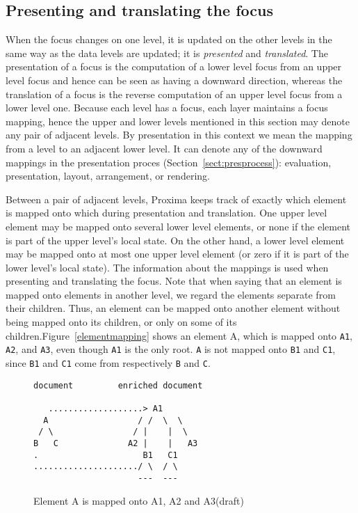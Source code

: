 \subsection{Presenting and translating the focus}

When the focus changes on one level, it is updated on the other levels in the same way as the data levels are updated; it is {\em presented} and {\em translated}. The presentation of a focus is the computation of a lower level focus from an upper level focus and hence can be seen as having a downward direction, whereas the translation of a focus is the reverse computation of an upper level focus from a lower level one. Because each level has a focus, each layer maintains a focus mapping, hence the upper and lower levels mentioned in this section may denote any pair of adjacent levels. By presentation in this context we mean the mapping from a level to an adjacent lower level. It can denote any of the downward mappings in the presentation proces (Section~\ref{sect:presprocess}): evaluation, presentation, layout, arrangement, or rendering.

Between a pair of adjacent levels, Proxima keeps track of exactly which element is mapped onto which during presentation and translation.  One upper level element may be mapped onto several lower level elements, or none if the element is part of the upper level's local state. On the other hand, a lower level element may be mapped onto at most one upper level element (or zero if it is part of the lower level's local state). The information about the mappings is used when presenting and translating the focus. Note that when saying that an element is mapped onto elements in another level, we regard the elements separate from their children. Thus, an element can be mapped onto another element without being mapped onto its children, or only on some of its children.Figure~\ref{elementmapping} shows an element A, which is mapped onto \verb|A1|, \verb|A2|, and \verb|A3|, even though \verb|A1| is the only root. \verb|A| is not mapped onto \verb|B1| and \verb|C1|, since \verb|B1| and \verb|C1| come from respectively \verb|B| and \verb|C|.  

\begin{figure}
\begin{small}
\begin{center}
\begin{verbatim}
document         enriched document

   ...................> A1
  A                  / /  \  \ 
 / \                / |    |  \ 
B   C              A2 |    |   A3
.                     B1   C1  
...................../ \  / \
                     ---  ---
\end{verbatim}
\caption{Element A is mapped onto A1, A2 and A3(draft)}\label{unpresentableFocus} 
\end{center}
\end{small}
\end{figure}

